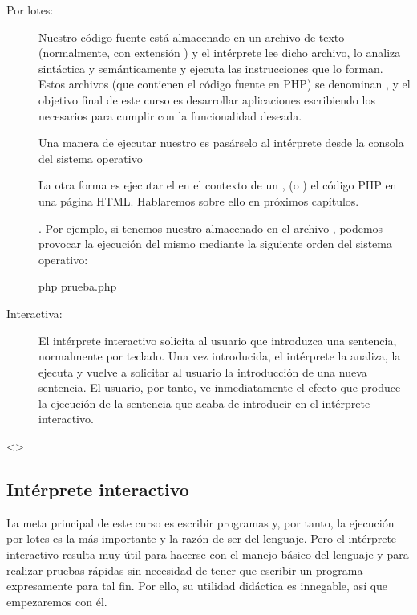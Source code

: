 \documentclass[a4paper,12pt,spanish]{sphinxmanual}
\begin{document}
\ignorespaces \begin{description}
\item[{Por lotes:}] \leavevmode
Nuestro código fuente está almacenado en un archivo de texto (normalmente,
con extensión ) y el intérprete lee dicho archivo, lo analiza
sintáctica y semánticamente y ejecuta las instrucciones que lo forman. Estos
archivos (que contienen el código fuente en PHP) se denominan , y
el objetivo final de este curso es desarrollar aplicaciones escribiendo los
 necesarios para cumplir con la funcionalidad deseada.

Una manera de ejecutar nuestro  es pasárselo al intérprete desde la
consola del sistema operativo %
\begin{footnote}[6]\sphinxAtStartFootnote
La otra forma es ejecutar el  en el contexto de un ,  (o ) el código PHP en una página HTML.
Hablaremos sobre ello en próximos capítulos.
%
\end{footnote}. Por ejemplo, si tenemos nuestro
 almacenado en el archivo , podemos provocar la
ejecución del mismo mediante la siguiente orden del sistema operativo:

%
\begin{sphinxVerbatim}[commandchars=\\\{\}]
 php prueba.php
\end{sphinxVerbatim}

\item[{Interactiva:}] \leavevmode
El intérprete interactivo solicita al usuario que introduzca una sentencia,
normalmente por teclado. Una vez introducida, el intérprete la analiza, la
ejecuta y vuelve a solicitar al usuario la introducción de una nueva
sentencia. El usuario, por tanto, ve inmediatamente el efecto que produce la
ejecución de la sentencia que acaba de introducir en el intérprete
interactivo.

\end{description}

\textless{}\textgreater{}


\subsection{Intérprete interactivo}
\label{\detokenize{php:interprete-interactivo}}
La meta principal de este curso es escribir programas y, por tanto, la ejecución
por lotes es la más importante y la razón de ser del lenguaje. Pero el
intérprete interactivo resulta muy útil para hacerse con el manejo básico del
lenguaje y para realizar pruebas rápidas sin necesidad de tener que escribir un
programa expresamente para tal fin. Por ello, su utilidad didáctica es
innegable, así que empezaremos con él.
\end{document}
